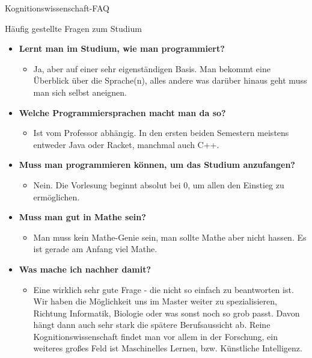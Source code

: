 \begin{Huge}
	Kognitionswissenschaft-FAQ
\end{Huge}
\begin{block}{Häufig gestellte Fragen zum Studium}
\begin{large}
\begin{itemize}
	\item \textbf{Lernt man im Studium, wie man programmiert?}
	\begin{itemize}
		\item Ja, aber auf einer sehr eigenständigen Basis. Man bekommt eine Überblick über die Sprache(n), alles andere was darüber hinaus geht muss man sich selbst aneignen.
	\end{itemize}

	
	\item \textbf{Welche Programmiersprachen macht man da so?}
	\begin{itemize}
		\item Ist vom Professor abhängig. In den ersten beiden Semestern meistens entweder Java oder Racket, manchmal auch C++.
	\end{itemize}



	\item \textbf{Muss man programmieren können, um das Studium anzufangen?}
	\begin{itemize}
		\item Nein. Die Vorlesung beginnt absolut bei 0, um allen den Einstieg zu ermöglichen.
	\end{itemize}



	\item \textbf{Muss man gut in Mathe sein?}
	\begin{itemize}
		\item Man muss kein Mathe-Genie sein, man sollte Mathe aber nicht hassen. Es ist gerade am Anfang viel Mathe.
	\end{itemize}



	\item \textbf{Was mache ich nachher damit?}
	\begin{itemize}
		\item Eine wirklich sehr gute Frage - die nicht so einfach zu beantworten ist. Wir haben die Möglichkeit uns im Master weiter zu spezialisieren, Richtung Informatik, Biologie oder was sonst noch so grob passt. Davon hängt dann auch sehr stark die spätere Berufsaussicht ab. Reine Kognitionswissenschaft findet man vor allem in der Forschung, ein weiteres großes Feld ist Maschinelles Lernen, bzw. Künstliche Intelligenz.
	\end{itemize}




\end{itemize}
\end{large}
\end{block}

